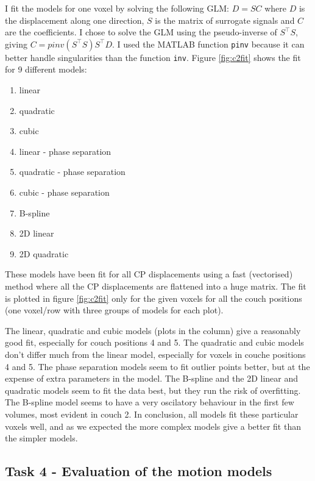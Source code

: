 \documentclass[11pt,a4paper,oneside]{report}
\begin{document}
I fit the models for one voxel by solving the following GLM: $D = SC$ where $D$ is the displacement along one direction, $S$ is the matrix of surrogate signals and $C$ are the coefficients. I chose to solve the GLM using the pseudo-inverse of $S^\top S$, giving $C = pinv(S^\top S)S^\top D$. I used the MATLAB function \texttt{pinv} because it can better handle singularities than the function \texttt{inv}. Figure \ref{fig:c2fit} shows the fit for 9 different models:
\begin{multicols}{3}
\begin{enumerate}
 \item linear
 \item quadratic
 \item cubic
 \item linear - phase separation
 \item quadratic - phase separation
 \item cubic - phase separation
 \item B-spline
 \item 2D linear
 \item 2D quadratic
\end{enumerate}
\end{multicols}

These models have been fit for all CP displacements using a fast (vectorised) method where all the CP displacements are flattened into a huge matrix. The fit is plotted in figure \ref{fig:c2fit} only for the given voxels for all the couch positions (one voxel/row with three groups of models for each plot).

The linear, quadratic and cubic models (plots in the column) give a reasonably good fit, especially for couch positions 4 and 5. The quadratic and cubic models don't differ much from the linear model, especially for voxels in couche positions 4 and 5. The phase separation models seem to fit outlier points better, but at the expense of extra parameters in the model. The B-spline and the 2D linear and quadratic models seem to fit the data best, but they run the risk of overfitting. The B-spline model seems to have a very oscilatory behaviour in the first few volumes, most evident in couch 2. In conclusion, all models fit these particular voxels well, and as we expected the more complex models give a better fit than the simpler models.

\subsection*{Task 4 - Evaluation of the motion models}
\end{document}
